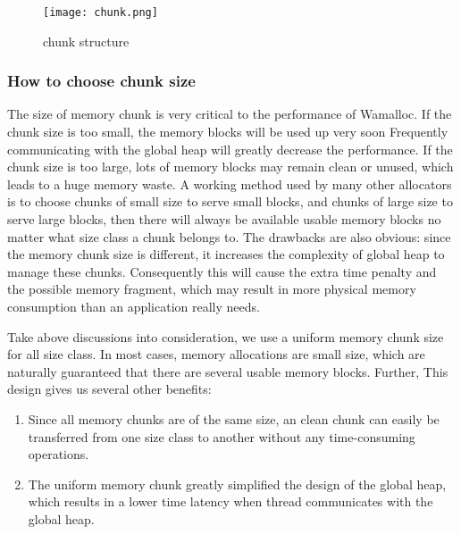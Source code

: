 \documentclass[10pt, conference, compsocconf]{IEEEtran}
\begin{document}
\begin{figure}[h]
\centering
\texttt{[image: chunk.png]}
\caption{chunk structure}
\label{fig:chunk}
\end{figure}

\subsubsection{How to choose chunk size}
The size of memory chunk is very critical to the performance of Wamalloc. 
If the chunk size is too small, 
the memory blocks will be used up very soon
Frequently communicating with the global heap will greatly decrease the performance.
If the chunk size is too large, lots of memory blocks may remain clean or unused, which leads to a huge memory waste. 
A working method used by many other allocators is to choose chunks of small size to serve small blocks, 
and chunks of large size to serve large blocks,
then there will always be available usable memory blocks no matter what size class a chunk belongs to.
The drawbacks are also obvious:
since the memory chunk size is different, it increases the complexity of global heap to manage these chunks.
Consequently this will cause the extra time penalty and the possible memory fragment, 
which may result in more physical memory consumption than an application really needs.

Take above discussions into consideration, 
we use a uniform memory chunk size for all size class. 
In most cases, memory allocations are small size, 
which are naturally guaranteed that there are several usable memory blocks. 
Further, This design gives us several other benefits: 
\begin{enumerate}
    \item Since all memory chunks are of the same size, an clean chunk can easily be transferred from one size class to another without any time-consuming operations.
    \item The uniform memory chunk greatly simplified the design of the global heap, 
        which results in a lower time latency when thread communicates with the global heap.
\end{enumerate}
\end{document}
